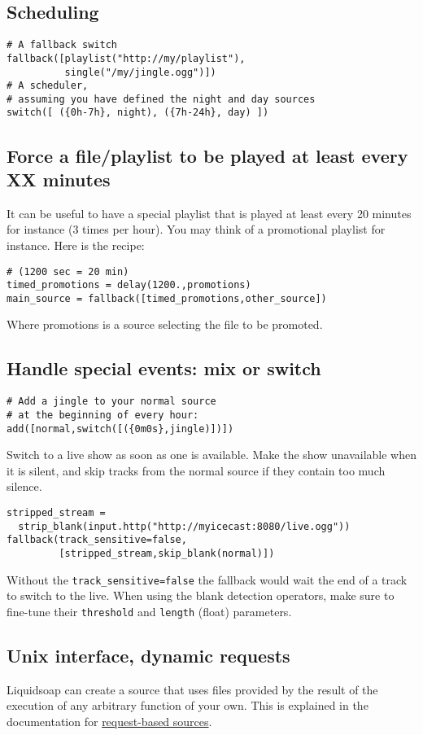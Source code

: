 \subsection{Scheduling}
\begin{verbatim}
# A fallback switch
fallback([playlist("http://my/playlist"),
          single("/my/jingle.ogg")])
# A scheduler,
# assuming you have defined the night and day sources
switch([ ({0h-7h}, night), ({7h-24h}, day) ])
\end{verbatim}
\subsection{Force a file/playlist to be played at least every XX minutes}
It can be useful to have a special playlist that is played at least every 20 minutes for instance (3 times per hour).
You may think of a promotional playlist for instance.
Here is the recipe:

\begin{verbatim}
# (1200 sec = 20 min)
timed_promotions = delay(1200.,promotions)
main_source = fallback([timed_promotions,other_source])
\end{verbatim}
Where promotions is a source selecting the file to be promoted.

\subsection{Handle special events: mix or switch}
\begin{verbatim}
# Add a jingle to your normal source
# at the beginning of every hour:
add([normal,switch([({0m0s},jingle)])])
\end{verbatim}
Switch to a live show as soon as one is available. Make the show unavailable when it is silent, and skip tracks from the normal source if they contain too much silence.

\begin{verbatim}
stripped_stream = 
  strip_blank(input.http("http://myicecast:8080/live.ogg"))
fallback(track_sensitive=false,
         [stripped_stream,skip_blank(normal)])
\end{verbatim}
Without the \verb+track_sensitive=false+ the fallback would wait the end of a track to switch to the live. When using the blank detection operators, make sure to fine-tune their \verb+threshold+ and \verb+length+ (float) parameters.

\subsection{Unix interface, dynamic requests}
Liquidsoap can create a source that uses files provided by the result of the execution of any arbitrary function of your own.
This is explained in the documentation for \href{request_sources.html}{request-based sources}.

